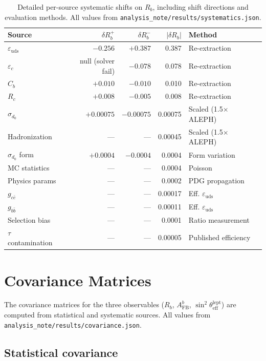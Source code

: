 \documentclass[11pt,a4paper]{article}
\begin{document}
\begin{table}[htbp]
\centering
\caption{Detailed per-source systematic shifts on $R_b$, including shift directions
and evaluation methods. All values from \texttt{analysis\_note/results/systematics.json}.}
\label{tab:syst_perbin_rb}
\small
\begin{tabular}{lrrrl}
\toprule
Source & $\delta R_b^{+}$ & $\delta R_b^{-}$ & $|\delta R_b|$ & Method \\
\midrule
$\varepsilon_\mathrm{uds}$ & $-0.256$ & $+0.387$ & 0.387 & Re-extraction \\
$\varepsilon_c$ & null (solver fail) & $-0.078$ & 0.078 & Re-extraction \\
$C_b$ & $+0.010$ & $-0.010$ & 0.010 & Re-extraction \\
$R_c$ & $+0.008$ & $-0.005$ & 0.008 & Re-extraction \\
$\sigma_{d_0}$ & $+0.00075$ & $-0.00075$ & 0.00075 & Scaled (1.5$\times$ ALEPH) \\
Hadronization & --- & --- & 0.00045 & Scaled (1.5$\times$ ALEPH) \\
$\sigma_{d_0}$ form & $+0.0004$ & $-0.0004$ & 0.0004 & Form variation \\
MC statistics & --- & --- & 0.0004 & Poisson \\
Physics params & --- & --- & 0.0002 & PDG propagation \\
$g_{c\bar{c}}$ & --- & --- & 0.00017 & Eff. $\varepsilon_\mathrm{uds}$ \\
$g_{b\bar{b}}$ & --- & --- & 0.00011 & Eff. $\varepsilon_\mathrm{uds}$ \\
Selection bias & --- & --- & 0.0001 & Ratio measurement \\
$\tau$ contamination & --- & --- & 0.00005 & Published efficiency \\
\bottomrule
\end{tabular}
\end{table}

\section{Covariance Matrices}
\label{app:covariance}

The covariance matrices for the three observables ($R_b$, $A_\mathrm{FB}^b$,
$\sin^2\theta_\mathrm{eff}^\mathrm{lept}$) are computed from statistical and systematic
sources. All values from \texttt{analysis\_note/results/covariance.json}.

\subsection{Statistical covariance}
\end{document}
